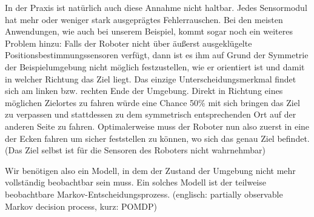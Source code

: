 \documentclass[a4paper]{IEEEtran}
\begin{document}
In der Praxis ist natürlich auch diese Annahme nicht haltbar. Jedes Sensormodul hat mehr oder weniger stark ausgeprägtes Fehlerrauschen. Bei den meisten Anwendungen, wie auch bei unserem Beispiel, kommt sogar noch ein weiteres Problem hinzu: Falls der Roboter nicht über äußerst ausgeklügelte Positionsbestimmungssensoren verfügt, dann ist es ihm auf Grund der Symmetrie der Beispielumgebung nicht möglich festzustellen, wie er orientiert ist und damit in welcher Richtung das Ziel liegt. Das einzige Unterscheidungsmerkmal findet sich am linken bzw. rechten Ende der Umgebung. Direkt in Richtung eines möglichen Zielortes zu fahren würde eine Chance 50\% mit sich bringen das Ziel zu verpassen und stattdessen zu dem symmetrisch entsprechenden Ort auf der anderen Seite zu fahren. Optimalerweise muss der Roboter nun also zuerst in eine der Ecken fahren um sicher feststellen zu können, wo sich das genau Ziel befindet. (Das Ziel selbst ist für die Sensoren des Roboters nicht wahrnehmbar)

Wir benötigen also ein Modell, in dem der Zustand der Umgebung nicht mehr vollständig beobachtbar sein muss. Ein solches Modell ist der teilweise beobachtbare Markov-Entscheidungsprozess. (englisch: partially observable Markov decision process, kurz: POMDP)
\end{document}
